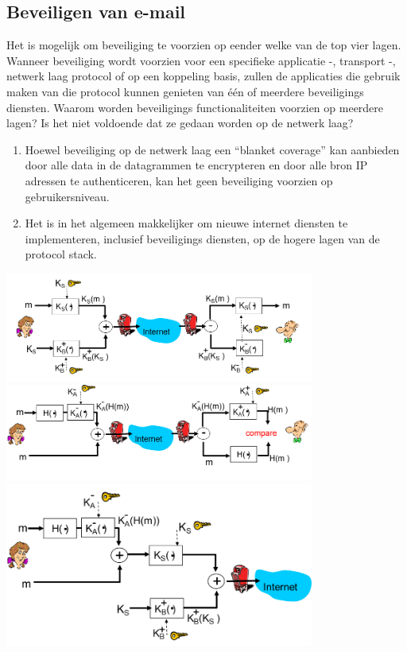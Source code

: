 \subsection{Beveiligen van e-mail}

Het is mogelijk om beveiliging te voorzien op eender welke van de top vier lagen. Wanneer beveiliging wordt voorzien voor een specifieke applicatie -, transport -, netwerk laag protocol of op een koppeling basis, zullen de applicaties die gebruik maken van die protocol kunnen genieten van één of meerdere beveiligings diensten.
Waarom worden beveiligings functionaliteiten voorzien op meerdere lagen? Is het niet voldoende dat ze gedaan worden op de netwerk laag?
\begin{enumerate}
    \item	Hoewel beveiliging op de netwerk laag een “blanket coverage” kan aanbieden door alle data in de datagrammen te encrypteren en door alle bron IP adressen te authenticeren, kan het geen beveiliging voorzien op gebruikersniveau.
\item Het is in het algemeen makkelijker om nieuwe internet diensten te implementeren, inclusief beveiligings diensten, op de hogere lagen van de protocol stack.
\end{enumerate}

\includegraphics[width=4in]{./img/imghfdst8/hfdst8puntje23.png}
\includegraphics[width=4in]{./img/imghfdst8/hfdst8puntje24.png}
\includegraphics[width=4in]{./img/imghfdst8/hfdst8puntje25.png}

